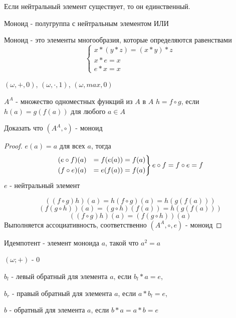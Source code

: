 \documentclass[../main/document.tex]{subfiles}
\begin{document}
\begin{cnsq}
Если нейтральный элемент существует, то он единственный.
\end{cnsq}
\begin{dfn}[Моноид]
Моноид - полугруппа с нейтральным элементом ИЛИ

Моноид - это элементы многообразия, которые определяются равенствами
$$
\begin{cases}
x*(y*z)=(x*y)*z\\
x*e=x\\
e*x=x
\end{cases}$$
\end{dfn}
\begin{exm}

$(\omega,+,0)$, $(\omega,\cdot,1)$, $(\omega,max,0)$

$A^A$ - множество одноместных функций из $A$ в $A$
$h=f\circ g$, если $h(a)=g(f(a))$ для любого $a\in A$

Доказать что $(A^A,\circ)$ - моноид
\begin{proof}
$e(a)=a$ для всех $a$, тогда
\begin{equation*}
\begin{rcases}
(e\circ f)(a) &= f(e(a))= f(a) \\
(f\circ e)(a) &= e(f(a))= f(a) 
\end{rcases}
e\circ f=f\circ e=f
\end{equation*}
$e$ - нейтральный элемент

$$((f\circ g)h)(a)=h(f\circ g)(a)=h(g(f(a)))$$
$$(f(g\circ h))(a)=(g\circ h)(f(a))=h(g(f(a)))$$
$$((f\circ g)h)(a)=(f(g\circ h))(a)$$
Выполняется ассоциативность, соответственно $(A^A,\circ,e)$ - моноид

\end{proof}
\end{exm}
\begin{dfn}[Идемпотент]
Идемпотент - элемент моноида $a$, такой что $a^2=a$
\end{dfn}

\begin{exm}
$(\omega;+)$ - $0$
\end{exm}

\begin{dfn}

$b_l$ - левый обратный для элемента $a$, если $b_l*a=e$,

$b_r$ - правый обратный для элемента $a$, если $a*b_l=e$,

$b$ - обратный для элемента $a$, если $b*a=a*b=e$
\end{dfn}
\end{document}
